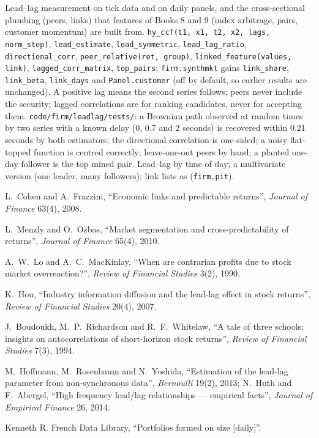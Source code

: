\begin{build}
 Lead--lag measurement on tick data and on daily panels, and the cross-sectional plumbing (peers, links) that features
of Books 8 and 9 (index arbitrage, pairs, customer momentum) are built from.
 \texttt{hy\_ccf(t1, x1, t2, x2, lags, norm\_step)}, \texttt{lead\_estimate}, \texttt{lead\_symmetric}, \texttt{lead\_lag\_ratio},
\texttt{directional\_corr}, \texttt{peer\_relative(ret, group)}, \texttt{linked\_feature(values, link)}, \texttt{lagged\_corr\_matrix},
\texttt{top\_pairs}; \texttt{firm.synthmkt} gains \texttt{link\_share}, \texttt{link\_beta}, \texttt{link\_days} and \texttt{Panel.customer}
(off by default, so earlier results are unchanged).
 A positive lag means the second series follows; peers never include the security; lagged correlations are for ranking
candidates, never for accepting them.
 \texttt{code/firm/leadlag/tests/}: a Brownian path observed at random times by two series with a known delay
(0, 0.7 and 2 seconds) is recovered within 0.21 seconds by both estimators; the directional correlation is one-sided; a noisy flat-topped
function is centred correctly; leave-one-out peers by hand; a planted one-day follower is the top mined pair.
 Lead--lag by time of day; a multivariate version (one leader, many followers); link lists as 
(\texttt{firm.pit}).
\end{build}

\begin{omsources}
\item L.~Cohen and A.~Frazzini, ``Economic links and predictable returns'', \emph{Journal of Finance} 63(4), 2008.
\item L.~Menzly and O.~Ozbas, ``Market segmentation and cross-predictability of returns'', \emph{Journal of Finance} 65(4), 2010.
\item A.~W.~Lo and A.~C.~MacKinlay, ``When are contrarian profits due to stock market overreaction?'', \emph{Review of Financial Studies}
3(2), 1990.
\item K.~Hou, ``Industry information diffusion and the lead-lag effect in stock returns'', \emph{Review of Financial Studies} 20(4), 2007.
\item J.~Boudoukh, M.~P.~Richardson and R.~F.~Whitelaw, ``A tale of three schools: insights on autocorrelations of short-horizon stock
returns'', \emph{Review of Financial Studies} 7(3), 1994.
\item M.~Hoffmann, M.~Rosenbaum and N.~Yoshida, ``Estimation of the lead-lag parameter from non-synchronous data'', \emph{Bernoulli} 19(2),
2013; N.~Huth and F.~Abergel, ``High frequency lead/lag relationships --- empirical facts'', \emph{Journal of Empirical Finance} 26, 2014.
\item Kenneth R. French Data Library, ``Portfolios formed on size [daily]''.
\end{omsources}

